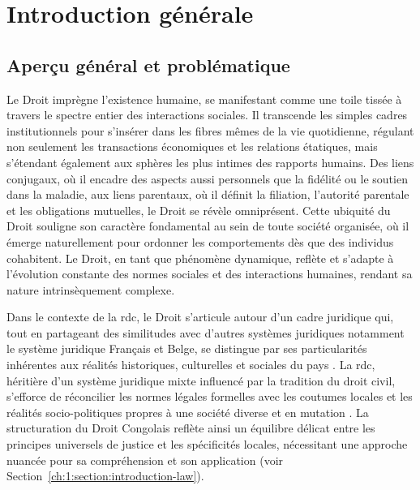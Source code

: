 
\chapter{Introduction générale} %

\label{ch:0} %

\section{Aperçu général et problématique}

Le Droit imprègne l'existence humaine, se manifestant comme une toile tissée à travers le spectre entier des interactions sociales. Il transcende les simples cadres institutionnels pour s'insérer dans les fibres mêmes de la vie quotidienne, régulant non seulement les transactions économiques et les relations étatiques, mais s'étendant également aux sphères les plus intimes des rapports humains. Des liens conjugaux, où il encadre des aspects aussi personnels que la fidélité ou le soutien dans la maladie, aux liens parentaux, où il définit la filiation, l'autorité parentale et les obligations mutuelles, le Droit se révèle omniprésent. Cette ubiquité du Droit souligne son caractère fondamental au sein de toute société organisée, où il émerge naturellement pour ordonner les comportements dès que des individus cohabitent. Le Droit, en tant que phénomène dynamique, reflète et s'adapte à l'évolution constante des normes sociales et des interactions humaines, rendant sa nature intrinsèquement complexe. \cite{Aubert_Savaux_2010}

Dans le contexte de la \ac{rdc}, le Droit s'articule autour d'un cadre juridique qui, tout en partageant des similitudes avec d'autres systèmes juridiques notamment le système juridique Français et Belge, se distingue par ses particularités inhérentes aux réalités historiques, culturelles et sociales du pays \cite{Mwadiavita_2023}. La \ac{rdc}, héritière d'un système juridique mixte influencé par la tradition du droit civil, s'efforce de réconcilier les normes légales formelles avec les coutumes locales et les réalités socio-politiques propres à une société diverse et en mutation \cite{Bulambo_2012}.  La structuration du Droit Congolais reflète ainsi un équilibre délicat entre les principes universels de justice et les spécificités locales, nécessitant une approche nuancée pour sa compréhension et son application (voir Section~\ref{ch:1:section:introduction-law}).

